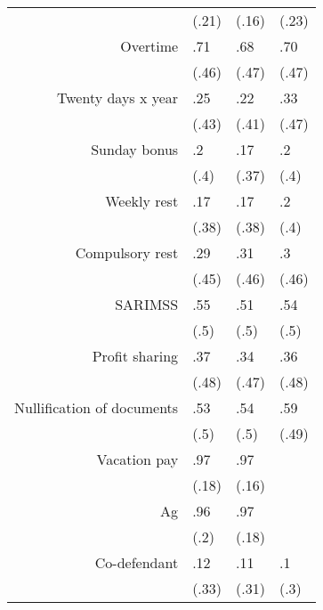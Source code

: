 \begin{tabular}{rrrr}
      & \multicolumn{1}{l}{(.21)} & \multicolumn{1}{l}{(.16)} & \multicolumn{1}{l}{(.23)} \\
Overtime & \multicolumn{1}{l}{.71} & \multicolumn{1}{l}{.68} & \multicolumn{1}{l}{.70} \\
      & \multicolumn{1}{l}{(.46)} & \multicolumn{1}{l}{(.47)} & \multicolumn{1}{l}{(.47)} \\
Twenty days x year & \multicolumn{1}{l}{.25} & \multicolumn{1}{l}{.22} & \multicolumn{1}{l}{.33} \\
      & \multicolumn{1}{l}{(.43)} & \multicolumn{1}{l}{(.41)} & \multicolumn{1}{l}{(.47)} \\
Sunday bonus & \multicolumn{1}{l}{.2} & \multicolumn{1}{l}{.17} & \multicolumn{1}{l}{.2} \\
      & \multicolumn{1}{l}{(.4)} & \multicolumn{1}{l}{(.37)} & \multicolumn{1}{l}{(.4)} \\
Weekly rest & \multicolumn{1}{l}{.17} & \multicolumn{1}{l}{.17} & \multicolumn{1}{l}{.2} \\
      & \multicolumn{1}{l}{(.38)} & \multicolumn{1}{l}{(.38)} & \multicolumn{1}{l}{(.4)} \\
Compulsory rest & \multicolumn{1}{l}{.29} & \multicolumn{1}{l}{.31} & \multicolumn{1}{l}{.3} \\
      & \multicolumn{1}{l}{(.45)} & \multicolumn{1}{l}{(.46)} & \multicolumn{1}{l}{(.46)} \\
SARIMSS & \multicolumn{1}{l}{.55} & \multicolumn{1}{l}{.51} & \multicolumn{1}{l}{.54} \\
      & \multicolumn{1}{l}{(.5)} & \multicolumn{1}{l}{(.5)} & \multicolumn{1}{l}{(.5)} \\
Profit sharing & \multicolumn{1}{l}{.37} & \multicolumn{1}{l}{.34} & \multicolumn{1}{l}{.36} \\
      & \multicolumn{1}{l}{(.48)} & \multicolumn{1}{l}{(.47)} & \multicolumn{1}{l}{(.48)} \\
Nullification of documents & \multicolumn{1}{l}{.53} & \multicolumn{1}{l}{.54} & \multicolumn{1}{l}{.59} \\
      & \multicolumn{1}{l}{(.5)} & \multicolumn{1}{l}{(.5)} & \multicolumn{1}{l}{(.49)} \\
Vacation pay & \multicolumn{1}{l}{.97} & \multicolumn{1}{l}{.97} & \multicolumn{1}{l}{} \\
      & \multicolumn{1}{l}{(.18)} & \multicolumn{1}{l}{(.16)} & \multicolumn{1}{l}{} \\
Ag    & \multicolumn{1}{l}{.96} & \multicolumn{1}{l}{.97} & \multicolumn{1}{l}{} \\
      & \multicolumn{1}{l}{(.2)} & \multicolumn{1}{l}{(.18)} & \multicolumn{1}{l}{} \\
Co-defendant & \multicolumn{1}{l}{.12} & \multicolumn{1}{l}{.11} & \multicolumn{1}{l}{.1} \\
      & \multicolumn{1}{l}{(.33)} & \multicolumn{1}{l}{(.31)} & \multicolumn{1}{l}{(.3)} \\
\bottomrule
\bottomrule
\end{tabular}%

